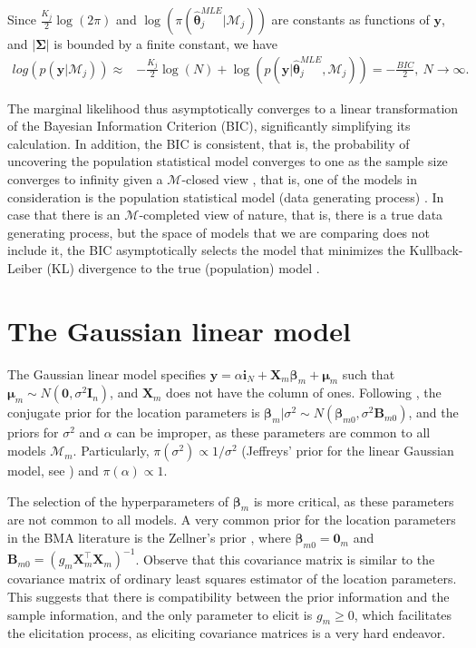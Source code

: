 Since $\frac{K_j}{2}\log(2\pi)$ and $\log(\pi(\bm{\hat{\theta}}_j^{MLE} | \mathcal{M}_j))$ are constants as functions of $\bm{y}$, and $|\bm{\Sigma}|$ is bounded by a finite constant, we have
\begin{align*}
	log\left(p(\bm{y} | \mathcal{M}_j)\right)\approx& -\frac{K_j}{2}\log(N)+\log(p(\bm{y}| \bm{\hat{\theta}}_j^{MLE},\mathcal{M}_j))= -\frac{BIC}{2}, \ N \rightarrow \infty.
\end{align*}

The marginal likelihood thus asymptotically converges to a linear transformation of the Bayesian Information Criterion (BIC), significantly simplifying its calculation. In addition, the BIC is consistent, that is, the probability of uncovering the population statistical model converges to one as the sample size converges to infinity given a $\mathcal{M}$-closed view \cite[Chap.~6]{Bernardo1994}, that is, one of the models in consideration is the population statistical model (data generating process) \cite{schwarz1978estimating, burnham2004multimodel}. In case that there is an $\mathcal{M}$-completed view of nature, that is, there is a true data generating process, but the space of models that we are comparing does not include it, the BIC asymptotically selects the model that minimizes the Kullback-Leiber (KL) divergence to the true (population) model \cite[Chap. ~4]{claeskens2008model}. 


\section{The Gaussian linear model}\label{sec10_2}

The Gaussian linear model specifies $\bm{y}=\alpha\bm{i}_N+\bm{X}_m\bm{\beta}_m+\bm{\mu}_m$ such that $\bm{\mu}_m\sim{N}(\bm{0},\sigma^2\bm{I}_n)$, and $\bm{X}_m$ does not have the column of ones. Following \cite{koop2003bayesian}, the conjugate prior for the location parameters is $\bm{\beta}_m|\sigma^2 \sim {N}(\bm{\beta}_{m0}, \sigma^2 \bm{B}_{m0})$, and the priors for $\sigma^2$ and $\alpha$ can be improper, as these parameters are common to all models $\mathcal{M}_m$. Particularly, $\pi(\sigma^2)\propto 1/\sigma^2$ (Jeffreys' prior for the linear Gaussian model, see \cite{prior1991bayesian}) and $\pi(\alpha)\propto 1$.

The selection of the hyperparameters of $\bm{\beta}_m$ is more critical, as these parameters are not common to all models. A very common prior for the location parameters in the BMA literature is the Zellner's prior \cite{zellner1986assessing}, where $\bm{\beta}_{m0}=\bm{0}_m$ and $\bm{B}_{m0}=(g_m\bm{X}_m^{\top}\bm{X}_m)^{-1}$. Observe that this covariance matrix is similar to the covariance matrix of ordinary least squares estimator of the location parameters. This suggests that there is compatibility between the prior information and the sample information, and the only parameter to elicit is $g_m\geq 0$, which facilitates the elicitation process, as eliciting covariance matrices is a very hard endeavor.

